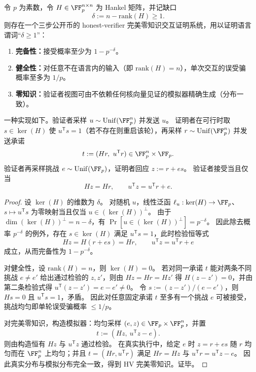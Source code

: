 \begin{theorem}\label{thm:xi-hankel-singularity-hvzk}
令 \(p\) 为素数，令 \(H\in \FF_p^{n\times n}\) 为 Hankel 矩阵，并记缺口
\[
\delta:=n-\mathrm{rank}(H)\ge 1.
\]
则存在一个三步公开币的 honest-verifier 完美零知识交互证明系统，用以证明语言谓词“\(\delta\ge 1\)”：
\begin{enumerate}
  \item \textbf{完备性：}接受概率至少为 \(1-p^{-\delta}\)。
  \item \textbf{健全性：}对任意不在语言内的输入（即 \(\mathrm{rank}(H)=n\)），单次交互的误受骗概率至多为 \(1/p\)。
  \item \textbf{零知识：}验证者视图可由不依赖任何核向量见证的模拟器精确生成（分布一致）。
\end{enumerate}
一种实现如下。验证者采样 \(u\sim \mathrm{Unif}(\FF_p^n)\) 并发送 \(u\)。
证明者在可行时取 \(s\in\ker(H)\) 使 \(u^{\mathsf T}s=1\)（若不存在则重启该轮），再采样 \(r\sim\mathrm{Unif}(\FF_p^n)\) 并发送承诺
\[
t:=(Hr,\ u^{\mathsf T}r)\in \FF_p^n\times \FF_p.
\]
验证者再采样挑战 \(e\sim\mathrm{Unif}(\FF_p)\)，证明者回应 \(z:=r+es\)。
验证者接受当且仅当
\[
Hz=Hr,\qquad u^{\mathsf T}z=u^{\mathsf T}r+e.
\]
\end{theorem}
\begin{proof}
设 \(\ker(H)\) 的维数为 \(\delta\)。
对随机 \(u\)，线性泛函 \(\ell_u:\ker(H)\to \FF_p\)、\(s\mapsto u^{\mathsf T}s\) 为零映射当且仅当 \(u\in(\ker(H))^\perp\)。
由于 \(\dim(\ker(H))^\perp=n-\delta\)，有
\(
\Pr[u\in(\ker(H))^\perp]=p^{-\delta}
\)。
因此除去概率 \(p^{-\delta}\) 的例外，存在 \(s\in\ker(H)\) 满足 \(u^{\mathsf T}s=1\)，此时检验恒等式
\[
Hz=H(r+es)=Hr,\qquad u^{\mathsf T}z=u^{\mathsf T}r+e
\]
成立，从而完备性为 \(1-p^{-\delta}\)。
\par
对健全性，设 \(\mathrm{rank}(H)=n\)，则 \(\ker(H)=0\)。
若对同一承诺 \(t\) 能对两条不同挑战 \(e\neq e'\) 给出通过检验的 \(z,z'\)，则由 \(Hz=Hr=Hz'\) 得 \(H(z-z')=0\)，并由第二条检验式得 \(u^{\mathsf T}(z-z')=e-e'\neq 0\)。
令 \(s:=(z-z')/(e-e')\)，则 \(Hs=0\) 且 \(u^{\mathsf T}s=1\)，矛盾。
因此对任意固定承诺 \(t\) 至多有一个挑战 \(e\) 可被接受，挑战均匀即单轮误受骗概率 \(\le 1/p\)。
\par
对完美零知识，构造模拟器：均匀采样 \((e,z)\in\FF_p\times\FF_p^n\)，并置
\[
t:=(Hz,\ u^{\mathsf T}z-e).
\]
则由构造恒有 \(Hz\) 与 \(u^{\mathsf T}z\) 通过检验。
在真实执行中，给定 \(e\) 时 \(z=r+es\) 随 \(r\) 均匀而在 \(\FF_p^n\) 上均匀；并且 \(t=(Hr,u^{\mathsf T}r)\) 满足 \(Hr=Hz\) 与 \(u^{\mathsf T}r=u^{\mathsf T}z-e\)。
因此真实分布与模拟分布完全一致，得到 HV 完美零知识。证毕。
\end{proof}

